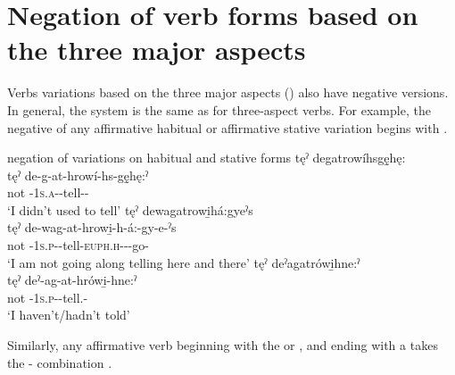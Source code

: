 \section{Negation of verb forms based on the three major aspects} \label{ch:Negation of verb forms based on the three major aspects}
Verbs variations based on the three major aspects () also have negative versions. In general, the system is the same as for three-aspect verbs. For example, the negative of any  affirmative habitual or affirmative stative variation begins with  \textsc{\negative} .

\ea\label{ex:no-mood-negation1} negation of variations on habitual and stative forms
\ea tęˀ degatrowíhsgę̱hę:\\
\gll tęˀ de-g-at-hrowí-hs-gę̱hę:ˀ\\
not {\negative}-\textsc{1s.a}-{\semireflexive}-tell-{\habitual}-{\past}\\
\glt  ‘I didn’t used to tell’
\newpage
{}
\ex tęˀ dewagatrowi̱há:gyeˀs  \\
\gll tęˀ de-wag-at-hrowi̱-h-á:-gy-e-ˀs\\
not {\negative}-\textsc{1s.p}-{\semireflexive}-tell-\textsc{euph.h}-{\joinerA}-{\progressive}-go-{\habitual}\\
\glt ‘I am not going along telling here and there’
\ex tęˀ deˀagatrówi̱hne:ˀ \\
tęˀ  deˀ-ag-at-hrówi̱-hne:ˀ \\
not {\negative}-\textsc{1s.p}-{\semireflexive}-tell.{\stative}-{\past}\\
\glt ‘I haven’t/hadn’t told’ 
\z
\z


Similarly, any affirmative verb beginning with the  \textsc{\future} or  \textsc{\indefinite}, and ending with a  \textsc{\modalizer} takes the  \textsc{\contrastive-\indefinite} combination .


